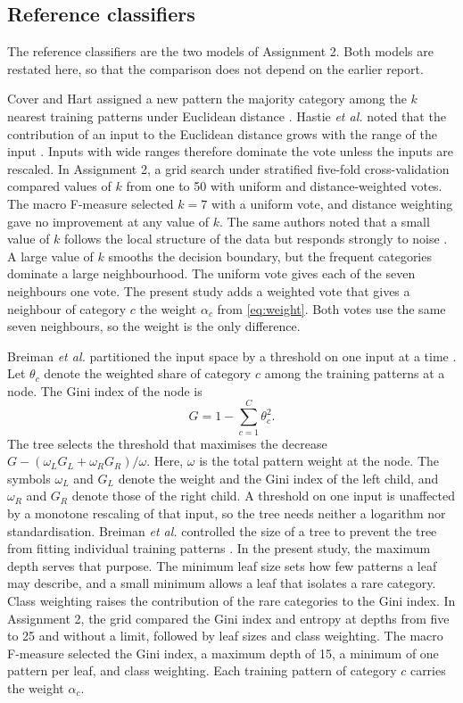 \documentclass[conference,10pt]{IEEEtran}
\begin{document}
\subsection{Reference classifiers}
The reference classifiers are the two models of Assignment 2.
Both models are restated here, so that the comparison does not depend on the earlier report.

Cover and Hart assigned a new pattern the majority category among the $k$ nearest training patterns under Euclidean distance \cite{cover1967}.
Hastie \emph{et al.} noted that the contribution of an input to the Euclidean distance grows with the range of the input \cite{hastie2009}.
Inputs with wide ranges therefore dominate the vote unless the inputs are rescaled.
In Assignment 2, a grid search under stratified five-fold cross-validation compared values of $k$ from one to 50 with uniform and distance-weighted votes.
The macro F-measure selected $k=7$ with a uniform vote, and distance weighting gave no improvement at any value of $k$.
The same authors noted that a small value of $k$ follows the local structure of the data but responds strongly to noise \cite{hastie2009}.
A large value of $k$ smooths the decision boundary, but the frequent categories dominate a large neighbourhood.
The uniform vote gives each of the seven neighbours one vote.
The present study adds a weighted vote that gives a neighbour of category $c$ the weight $\alpha_c$ from \eqref{eq:weight}.
Both votes use the same seven neighbours, so the weight is the only difference.

Breiman \emph{et al.} partitioned the input space by a threshold on one input at a time \cite{breiman1984}.
Let $\theta_c$ denote the weighted share of category $c$ among the training patterns at a node.
The Gini index of the node is
\begin{equation}
G=1-\sum_{c=1}^{C}\theta_c^2.
\label{eq:gini}
\end{equation}
The tree selects the threshold that maximises the decrease $G-(\omega_L G_L+\omega_R G_R)/\omega$.
Here, $\omega$ is the total pattern weight at the node.
The symbols $\omega_L$ and $G_L$ denote the weight and the Gini index of the left child, and $\omega_R$ and $G_R$ denote those of the right child.
A threshold on one input is unaffected by a monotone rescaling of that input, so the tree needs neither a logarithm nor standardisation.
Breiman \emph{et al.} controlled the size of a tree to prevent the tree from fitting individual training patterns \cite{breiman1984}.
In the present study, the maximum depth serves that purpose.
The minimum leaf size sets how few patterns a leaf may describe, and a small minimum allows a leaf that isolates a rare category.
Class weighting raises the contribution of the rare categories to the Gini index.
In Assignment 2, the grid compared the Gini index and entropy at depths from five to 25 and without a limit, followed by leaf sizes and class weighting.
The macro F-measure selected the Gini index, a maximum depth of 15, a minimum of one pattern per leaf, and class weighting.
Each training pattern of category $c$ carries the weight $\alpha_c$.
\end{document}
